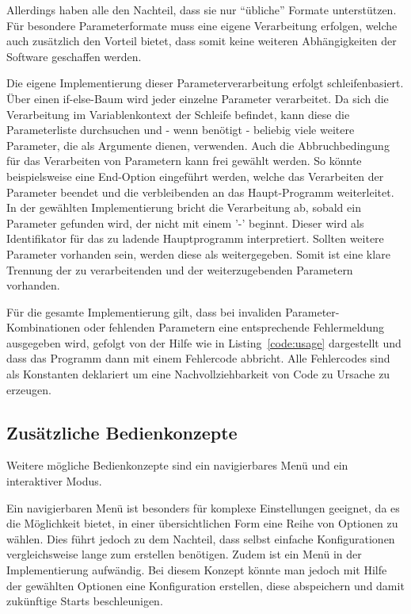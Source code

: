 Allerdings haben alle den Nachteil, dass sie nur "`übliche"' Formate unterstützen. Für besondere Parameterformate muss eine eigene Verarbeitung erfolgen, welche auch zusätzlich den Vorteil bietet, dass somit keine weiteren Abhängigkeiten der Software geschaffen werden.

Die eigene Implementierung dieser Parameterverarbeitung erfolgt schleifenbasiert. Über einen if-else-Baum wird jeder einzelne Parameter verarbeitet. Da sich die Verarbeitung im Variablenkontext der Schleife befindet, kann diese die Parameterliste durchsuchen und - wenn benötigt - beliebig viele weitere Parameter, die als Argumente dienen, verwenden. Auch die Abbruchbedingung für das Verarbeiten von Parametern kann frei gewählt werden. So könnte beispielsweise eine End-Option eingeführt werden, welche das Verarbeiten der Parameter beendet und die verbleibenden an das Haupt-Programm weiterleitet. In der gewählten Implementierung bricht die Verarbeitung ab, sobald ein Parameter gefunden wird, der nicht mit einem '-' beginnt. Dieser wird als Identifikator für das zu ladende Hauptprogramm interpretiert. Sollten weitere Parameter vorhanden sein, werden diese als  weitergegeben. Somit ist eine klare Trennung der zu verarbeitenden und der weiterzugebenden Parametern vorhanden.

Für die gesamte Implementierung gilt, dass bei invaliden Parameter-Kombinationen oder fehlenden Parametern eine entsprechende Fehlermeldung ausgegeben wird, gefolgt von der Hilfe wie in Listing~\ref{code:usage} dargestellt und dass das Programm dann mit einem Fehlercode abbricht. Alle Fehlercodes sind als Konstanten deklariert um eine Nachvollziehbarkeit von Code zu Ursache zu erzeugen.

 

\subsection{Zusätzliche Bedienkonzepte}

Weitere mögliche Bedienkonzepte sind ein navigierbares Menü und ein interaktiver Modus.

Ein navigierbaren Menü ist besonders für komplexe Einstellungen geeignet, da es die Möglichkeit bietet, in einer übersichtlichen Form eine Reihe von Optionen zu wählen. Dies führt jedoch zu dem Nachteil, dass selbst einfache Konfigurationen vergleichsweise lange zum erstellen benötigen. Zudem ist ein Menü in der Implementierung aufwändig. Bei diesem Konzept könnte man jedoch mit Hilfe der gewählten Optionen eine Konfiguration erstellen, diese abspeichern und damit zukünftige Starts beschleunigen. 

